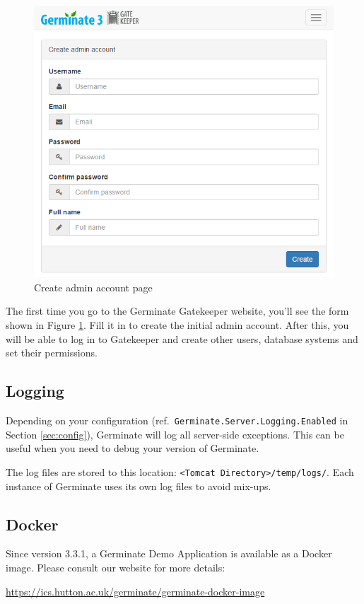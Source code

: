 \begin{figure}
	\centering
	\includegraphics[scale=0.4]{img/setup/create-admin.png}
	\caption{Create admin account page}
	\label{fig:create-admin}
\end{figure}

The first time you go to the Germinate Gatekeeper website, you'll see the form shown in Figure \ref{fig:create-admin}. Fill it in to create the initial admin account. After this, you will be able to log in to Gatekeeper and create other users, database systems and set their permissions.

\subsection{Logging}
\label{subsection:logging}
Depending on your configuration (ref.\ \texttt{Germinate.Server.Logging.Enabled} in Section \ref{sec:config}), Germinate will log all server-side exceptions. This can be useful when you need to debug your version of Germinate.

The log files are stored to this location: \texttt{<Tomcat Directory>/temp/logs/}. Each instance of Germinate uses its own log files to avoid mix-ups.

\subsection{Docker}
Since version 3.3.1, a Germinate Demo Application is available as a Docker image. Please consult our website for more details:
\begin{center}
	\url{https://ics.hutton.ac.uk/germinate/germinate-docker-image}
\end{center}